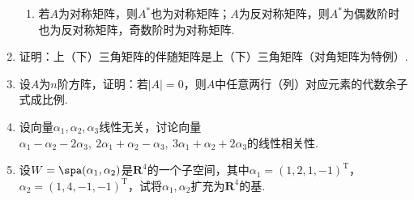 \begin{enumerate}
\begin{enumerate}
              \item 若$A$为对称矩阵，则$A^*$也为对称矩阵；$A$为反对称矩阵，则$A^*$为偶数阶时也为反对称矩阵，奇数阶时为对称矩阵.
          \end{enumerate}

    \item 证明：上（下）三角矩阵的伴随矩阵是上（下）三角矩阵（对角矩阵为特例）.

    \item 设$A$为$n$阶方阵，证明：若$|A|=0$，则$A$中任意两行（列）对应元素的代数余子式成比例.

    \item 设向量$\alpha_1,\alpha_2,\alpha_3$线性无关，讨论向量$\alpha_1-\alpha_2-2\alpha_3,\ 2\alpha_1+\alpha_2-\alpha_3,\ 3\alpha_1+\alpha_2+2\alpha_3$的线性相关性.

    \item 设$W=\spa(\alpha_1,\alpha_2)$是$\mathbf{R}^4$的一个子空间，其中$\alpha_1=(1,2,1,-1)^\mathrm{T}$，$\alpha_2=(1,4,-1,-1)^\mathrm{T}$，试将$\alpha_1,\alpha_2$扩充为$\mathbf{R}^4$的基.
\end{enumerate}

